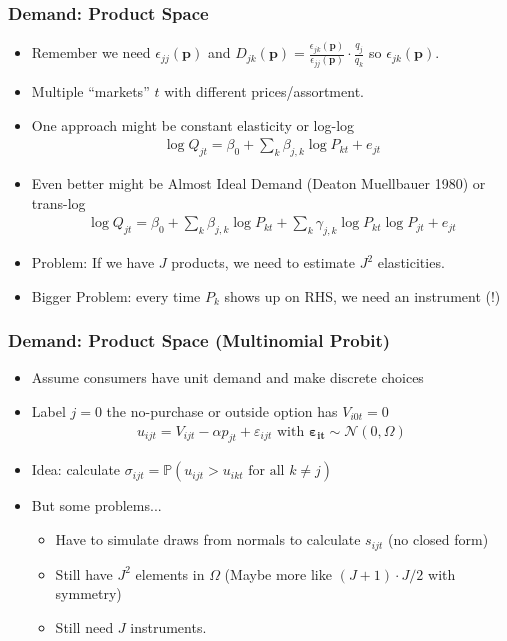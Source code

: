 \begin{frame}
\frametitle{Demand: Product Space}
\begin{itemize}
    \item Remember we need $\epsilon_{jj}(\symbf{p})$ and $D_{jk}(\symbf{p}) = \frac{\epsilon_{jk}(\symbf{p})}{\epsilon_{jj}(\symbf{p})}\cdot \frac{q_j}{q_k}$ so $\epsilon_{jk}(\symbf{p})$.
    \item Multiple ``markets'' $t$ with different prices/assortment.
    \item One approach might be \alert{constant elasticity} or \alert{log-log}
    \begin{align*}
        \log Q_{jt} = \beta_0 + \sum_{k} \beta_{j,k} \log P_{kt} + e_{jt}
    \end{align*}
    \item Even better might be \alert{Almost Ideal Demand} (Deaton Muellbauer 1980) or \alert{trans-log}
    \begin{align*}
        \log Q_{jt} = \beta_0 + \sum_{k} \beta_{j,k} \log P_{kt} + \sum_{k} \gamma_{j,k} \log P_{kt} \log P_{jt} +  e_{jt}
    \end{align*}
    \item Problem: If we have $J$ products, we need to estimate $J^2$ elasticities.
    \item Bigger Problem: every time $P_k$ shows up on RHS, we need an instrument (!)
\end{itemize}
\end{frame}

\begin{frame}
\frametitle{Demand: Product Space (Multinomial Probit)}

\begin{itemize}
    \item Assume consumers have unit demand and make discrete choices
    \item Label $j=0$ the no-purchase or outside option has $V_{i0t}=0$
    \begin{align*}
        u_{ijt} = V_{ijt} - \alpha p_{jt} +  \varepsilon_{ijt} \text{ with } \symbf{\varepsilon_{it}} \sim \mathcal{N}(0,\Omega)
    \end{align*}
    \item Idea: calculate $\sigma_{ijt} = \mathbb{P}(u_{ijt} > u_{ikt} \text{ for all } k \neq j)$
    \item But some problems...
    \begin{itemize}
        \item Have to \alert{simulate draws from normals} to calculate $s_{ijt}$ (no closed form)
        \item Still have $J^2$ elements in $\Omega$ (Maybe more like $(J+1) \cdot J / 2$ with symmetry)
        \item Still need $J$ instruments.
    \end{itemize}

\end{itemize}
\end{frame}




